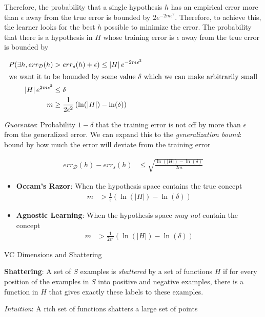 \documentclass{article}
\newcommand{\abs}[1]{\left| #1\right|}
\renewcommand{\dim}{\mathcal{D}}
\begin{document}
Therefore, the probability that a single hypothesis $h$ has an empirical error more than $\epsilon$ away from the true error is bounded by $2e^{-2m\epsilon^{2}}$. Therefore, to achieve this, the learner looks for the best $h$ possible to minimize the error. The probability that there is a hypothesis in $H$ whose training error is $\epsilon$ away from the true error is bounded by

\begin{align}
P(\exists h,err_{\dim}(h)&>err_{s}(h)+\epsilon) \leq \abs{H}e^{-2m\epsilon^{2}}\\
\intertext{we want it to be bounded by some value $\delta$ which we can make arbitrarily small}
\abs{H}e^{2m\epsilon^{2}} & \leq \delta\\
m & \geq \frac{1}{2\epsilon^{2}}\left(\ln(\abs{H}) - \ln(\delta)\right)
\end{align}

{\em Guarentee}: Probability $1-\delta$ that the training error is not off by more than $\epsilon$ from the generalized error. We can expand this to the {\em generalization bound}: bound by how much the error will deviate from the training error

\begin{align}
err_{\dim}(h)-err_{s}(h) &\leq \sqrt{\frac{\ln(\abs{H})-\ln(\delta)}{2m}}
\end{align}

\begin{itemize}
\item {\bf Occam's Razor}: When the hypothesis space contains the true concept
\begin{align}
m &> \frac{1}{\epsilon}\left(\ln(\abs{H})-\ln(\delta)\right)
\end{align}
\item {\bf Agnostic Learning}: When the hypothesis space {\em may not} contain the concept
\begin{align}
m &> \frac{1}{2\epsilon^{2}}\left(\ln(\abs{H})-\ln(\delta)\right)
\end{align}
\end{itemize}

{\large VC Dimensions and Shattering}

{\bf Shattering}: A set of $S$ examples is {\em shattered} by a set of functions $H$ if for every position of the examples in $S$ into positive and negative examples, there is a function in $H$ that gives exactly these labels to these examples.

{\em Intuition}: A rich set of functions shatters a large set of points
\end{document}
